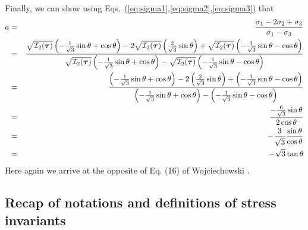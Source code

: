 Finally, we can show using Eqs.~(\ref{eq:sigma1},\ref{eq:sigma2},\ref{eq:sigma3}) that
\begin{eqnarray}
a 
&=&\frac{\sigma_1-2\sigma_2+\sigma_3}{\sigma_1-\sigma_3} \nonumber\\
&=& 
\frac{
\sqrt{{\cal I}_2({\bm \tau})} \left(-\frac{1}{\sqrt{3}}\sin \theta +\cos\theta \right) 
-2
\sqrt{{\cal I}_2({\bm \tau})} \left(\frac{2}{\sqrt{3}}\sin \theta   \right)   
+
\sqrt{{\cal I}_2({\bm \tau})} \left(-\frac{1}{\sqrt{3}}\sin \theta- \cos \theta \right)  
}{
\sqrt{{\cal I}_2({\bm \tau})} \left(-\frac{1}{\sqrt{3}}\sin \theta +\cos\theta \right)
- 
\sqrt{{\cal I}_2({\bm \tau})} \left(-\frac{1}{\sqrt{3}}\sin \theta- \cos \theta \right)  
}
\nonumber \\
&=& 
\frac{
\left(-\frac{1}{\sqrt{3}}\sin \theta +\cos\theta \right) 
-2
\left(\frac{2}{\sqrt{3}}\sin \theta   \right)   
+
\left(-\frac{1}{\sqrt{3}}\sin \theta- \cos \theta \right)  
}{
\left(-\frac{1}{\sqrt{3}}\sin \theta +\cos\theta \right)
- 
\left(-\frac{1}{\sqrt{3}}\sin \theta- \cos \theta \right)  
}
\nonumber \\
&=& 
\frac{
-\frac{6}{\sqrt{3}}\sin \theta  
}
{
2\cos\theta
}
\nonumber\\
&=& -\frac{3}{\sqrt{3}} \frac{\sin\theta}{\cos\theta} \nonumber\\
&=& -\sqrt{3} \tan\theta
\end{eqnarray}
Here again we arrive at the opposite of Eq. (16) of Wojciechowski \cite{wojc18}. 

\newpage

\subsection{Recap of notations and definitions of stress invariants \label{ss:recapInv}}























